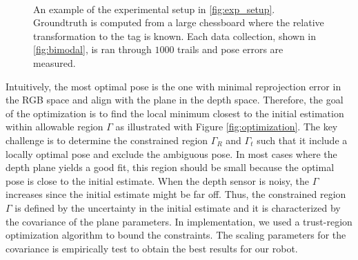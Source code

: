 \begin{figure}[h]
 \\
\caption{An example of the experimental setup in \ref{fig:exp_setup}. Groundtruth is computed from a large chessboard where the relative transformation to the tag is known. Each data collection, shown in \ref{fig:bimodal}, is ran through $1000$ trails and pose errors are measured.}
\label{fig:angle_result}
\end{figure}


Intuitively, the most optimal pose is the one with minimal reprojection error in the RGB space and align with the plane in the depth space. Therefore, the goal of the optimization is to find the local minimum closest to the initial estimation within allowable region $\Gamma$ as illustrated with Figure \ref{fig:optimization}. The key challenge is to determine the constrained region $\Gamma_R$ and $\Gamma_t$ such that it include a locally optimal pose and exclude the ambiguous pose. In most cases where the depth plane yields a good fit, this region should be small because the optimal pose is close to the initial estimate. When the depth sensor is noisy, the $\Gamma$ increases since the initial estimate might be far off. Thus, the constrained region $\Gamma$ is defined by the uncertainty in the initial estimate and it is characterized by the covariance of the plane parameters. In implementation, we used a trust-region optimization algorithm to bound the constraints. The scaling parameters for the covariance is empirically test to obtain the best results for our robot. 

